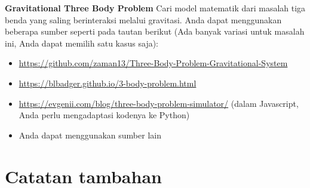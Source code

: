 \textbf{Gravitational Three Body Problem} Cari model matematik dari
masalah tiga benda yang saling berinteraksi melalui gravitasi. Anda dapat
menggunakan beberapa sumber seperti pada tautan berikut (Ada banyak variasi
untuk masalah ini, Anda dapat memilih satu kasus saja):
\begin{itemize}
\item {\footnotesize\url{https://github.com/zaman13/Three-Body-Problem-Gravitational-System}}
\item {\footnotesize\url{https://blbadger.github.io/3-body-problem.html}}
\item {\footnotesize\url{https://evgenii.com/blog/three-body-problem-simulator/}}
 (dalam Javascript, Anda perlu mengadaptasi kodenya ke Python)
 \item Anda dapat menggunakan sumber lain
\end{itemize}


\section*{Catatan tambahan}




